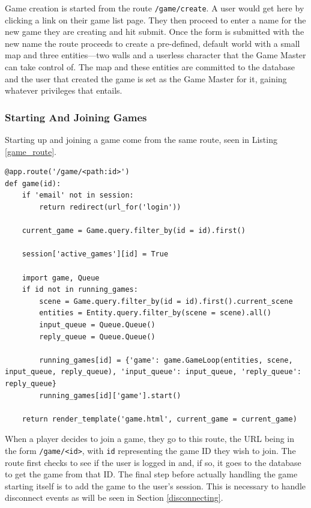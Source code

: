 Game creation is started from the route \texttt{/game/create}. A user would get here by clicking a link on their game list page. They then proceed to enter a name for the new game they are creating and hit submit. Once the form is submitted with the new name the route proceeds to create a pre-defined, default world with a small map and three entities---two walls and a userless character that the Game Master can take control of. The map and these entities are committed to the database and the user that created the game is set as the Game Master for it, gaining whatever privileges that entails.

\subsubsection{Starting And Joining Games}
Starting up and joining a game come from the same route, seen in Listing \ref{game_route}.

\noindent
\begin{minipage}{\linewidth}
\begin{lstlisting}[style=py, caption={The route responsible for starting a game thread.}, label=game_route]
@app.route('/game/<path:id>')
def game(id):
    if 'email' not in session:
        return redirect(url_for('login'))

    current_game = Game.query.filter_by(id = id).first()

    session['active_games'][id] = True

    import game, Queue
    if id not in running_games:
        scene = Game.query.filter_by(id = id).first().current_scene
        entities = Entity.query.filter_by(scene = scene).all()
        input_queue = Queue.Queue()
        reply_queue = Queue.Queue()

        running_games[id] = {'game': game.GameLoop(entities, scene, input_queue, reply_queue), 'input_queue': input_queue, 'reply_queue': reply_queue}
        running_games[id]['game'].start()

    return render_template('game.html', current_game = current_game)
\end{lstlisting}
\end{minipage}

When a player decides to join a game, they go to this route, the URL being in the form \texttt{/game/<id>}, with \texttt{id} representing the game ID they wish to join. The route first checks to see if the user is logged in and, if so, it goes to the database to get the game from that ID. The final step before actually handling the game starting itself is to add the game to the user's session. This is necessary to handle disconnect events as will be seen in Section \ref{disconnecting}.

